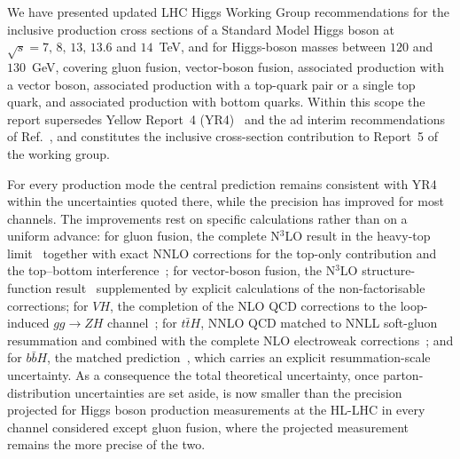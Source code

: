 We have presented updated LHC Higgs Working Group recommendations for the
inclusive production cross sections of a Standard Model Higgs boson at
$\sqrt{s}=7,\,8,\,13,\,13.6$ and $14$~TeV, and for Higgs-boson masses between
$120$ and $130$~GeV, covering gluon fusion, vector-boson fusion, associated
production with a vector boson, associated production with a top-quark pair or
a single top quark, and associated production with bottom quarks. Within this
scope the report supersedes Yellow Report~4
(YR4)~\cite{LHCHiggsCrossSectionWorkingGroup:2016ypw} and the ad interim
recommendations of Ref.~\cite{Karlberg:2024zxx}, and constitutes the inclusive
cross-section contribution to Report~5 of the working group.

For every production mode the central prediction remains consistent with YR4
within the uncertainties quoted there, while the precision has improved for
most channels. The improvements rest on specific calculations rather than on a
uniform advance: for gluon fusion, the complete N$^3$LO result in the heavy-top
limit~\cite{Mistlberger:2018etf} together with exact NNLO corrections for the
top-only contribution and the top--bottom
interference~\cite{Czakon:2024ywb}; for vector-boson fusion, the N$^3$LO
structure-function result~\cite{Dreyer:2016oyx} supplemented by explicit
calculations of the non-factorisable corrections; for $VH$, the completion of
the NLO QCD corrections to the loop-induced $gg\to ZH$
channel~\cite{CampilloAveleira:2025rbh}; for $t\bar tH$, NNLO QCD matched to
NNLL soft-gluon resummation and combined with the complete NLO electroweak
corrections~\cite{Balsach:2025jcw}; and for $b\bar bH$, the matched
\nlonnllpart{} prediction~\cite{Bonvini:2016fgf}, which carries an explicit
resummation-scale uncertainty. As a consequence the total theoretical
uncertainty, once parton-distribution uncertainties are set aside, is now
smaller than the precision projected for Higgs boson production
measurements at the HL-LHC in every channel considered except gluon fusion,
where the projected measurement remains the more precise of the two.

